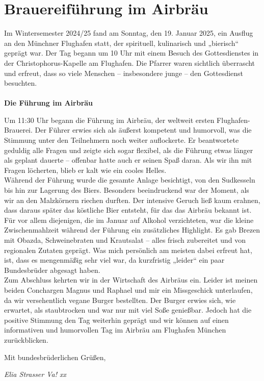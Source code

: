 \section{Brauereiführung im Airbräu}


\begin{multicols}{2}
Im Wintersemester 2024/25 fand am Sonntag, den 19. Januar 2025, ein Ausflug
an den Münchner Flughafen statt, der spirituell, kulinarisch und „bierisch“
geprägt war. Der Tag begann um 10 Uhr mit einem Besuch des Gottesdienstes in
der Christophorus-Kapelle am Flughafen. Die Pfarrer waren sichtlich überrascht
und erfreut, dass so viele Menschen – insbesondere junge – den Gottesdienst
besuchten.
\\
\\
\textbf{Die Führung im Airbräu}

Um 11:30 Uhr begann die Führung im Airbräu, der weltweit ersten
Flughafen-Brauerei. Der Führer erwies sich als äußerst kompetent und humorvoll,
was die Stimmung unter den Teilnehmern noch weiter auflockerte. Er beantwortete
geduldig alle Fragen und zeigte sich sogar flexibel, als die Führung etwas
länger als geplant dauerte – offenbar hatte auch er seinen Spaß daran. Als wir
ihn mit Fragen löcherten, blieb er kalt wie ein cooles Helles.\\
Während der Führung wurde die gesamte Anlage besichtigt, von den Sudkesseln
bis hin zur Lagerung des Biers. Besonders beeindruckend war der Moment, als wir
an den Malzkörnern riechen durften. Der intensive Geruch ließ kaum erahnen,
dass daraus später das köstliche Bier entsteht, für das das Airbräu bekannt
ist.\\
Für vor allem diejenigen, die im Januar auf Alkohol verzichteten, war die
kleine Zwischenmahlzeit während der Führung ein zusätzliches Highlight. Es gab
Brezen mit Obazda, Schweinebraten und Krautsalat – alles frisch zubereitet und
von regionalen Zutaten geprägt. Was mich persönlich am meisten dabei erfreut
hat, ist, dass es mengenmäßig sehr viel war, da kurzfristig „leider“ ein paar
Bundesbrüder abgesagt haben.\\
Zum Abschluss kehrten wir in der Wirtschaft des Airbräus ein. Leider ist
meinen beiden Conchargen Magnus und Raphael und mir ein Missgeschick
unterlaufen, da wir versehentlich vegane Burger bestellten. Der Burger erwies
sich, wie erwartet, als staubtrocken und war nur mit viel Soße genießbar.
Jedoch hat die positive Stimmung den Tag weiterhin geprägt und wir können auf
einen informativen und humorvollen Tag im Airbräu am Flughafen München
zurückblicken.

Mit bundesbrüderlichen Grüßen,

\begin{flushright}
		\hfill\emph{Elia Strasser Va! xx}
	\end{flushright}
		
\end{multicols}



